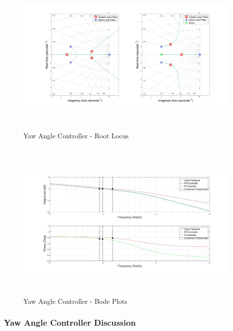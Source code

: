 		\begin{figure}[H]
			\centering
			\includegraphics[height = 8cm]{../Design/Matlab/Controllers/yaw_angle_root.jpg}
			\caption{Yaw Angle Controller -  Root Locus}
			\label{IM_YawAngleControlRoot}
		\end{figure}
		
		\begin{figure}[H]
			\centering
			\includegraphics[height = 8cm]{../Design/Matlab/Controllers/yaw_angle_bode.jpg}
			\caption{Yaw Angle Controller -  Bode Plots}
			\label{IM_YawAngleControlBode}
		\end{figure}
		
		\subsubsection{Yaw Angle Controller Discussion}	
		
